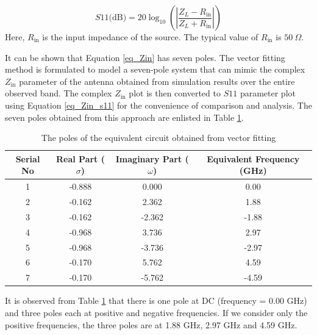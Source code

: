 \begin{equation}\label{eq_Zin_s11}
S11\text{(dB)}=20 \log_{10}{\left(\left|\frac{Z_L - R_{\text{in}}}{Z_L + R_{\text{in}}}\right|\right)}
\end{equation}
Here, $R_{\text{in}}$ is the input impedance of the source. The typical value of $R_{\text{in}}$ is $50~\Omega$.

It can be shown that Equation \ref{eq_Zin} has seven poles. The vector fitting method is formulated to model a seven-pole system that can mimic the complex $Z_{\text{in}}$ parameter of the antenna obtained from simulation results over the entire observed band. The complex $Z_{\text{in}}$ plot is then converted to $S11$ parameter plot using Equation \ref{eq_Zin_s11} for the convenience of comparison and analysis. The seven poles obtained from this approach are enlisted in Table \ref{table_poles}.

\begin{table}
\centering
\caption{The poles of the equivalent circuit obtained from vector fitting}\label{table_poles}
\begin{tabular}{|c|c|c|c|}
  \hline
  Serial No & Real Part ($\sigma$) & Imaginary Part ($\omega$) & Equivalent Frequency (GHz) \\ \hline
 1 & -0.888 & 0.000 & 0.00 \\ \hline
 2 & -0.162 & 2.362 & 1.88 \\ \hline
 3 & -0.162 & -2.362 & -1.88 \\ \hline
 4 & -0.968 & 3.736 & 2.97 \\ \hline
 5 & -0.968 & -3.736 & -2.97 \\ \hline
 6 & -0.170 & 5.762 & 4.59 \\ \hline
 7 & -0.170 & -5.762 & -4.59 \\ \hline
\end{tabular}
\end{table}

It is observed from Table \ref{table_poles} that there is one pole at DC (frequency = 0.00 GHz) and three poles each at positive and negative frequencies. If we consider only the positive frequencies, the three poles are at 1.88 GHz, 2.97 GHz and 4.59 GHz.


